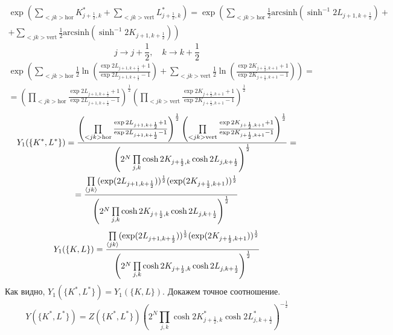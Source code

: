 \documentclass[12pt]{article}
\theoremstyle{definition}
\begin{document}
\begin{enumerate}
\begin{itemize}
\begin{multline}
        \exp\left(\sum\limits_{<jk>\text{hor}}K^*_{j+\frac{1}{2},k}+\sum\limits_{<jk>\text{vert}}L^*_{j+\frac{1}{2},k}\right)=\exp\left(\sum\limits_{<jk>\text{hor}}\frac{1}{2}\text{arcsinh}(\sinh^{-1}2L_{j+1,k+\frac{1}{2}})\right.+\\+\left.\sum\limits_{<jk>\text{vert}}\frac{1}{2}\text{arcsinh}(\sinh^{-1}2K_{j+1,k+\frac{1}{2}})\right)
    \end{multline}
    \begin{equation}
        j\rightarrow j+\frac{1}{2},\quad k\rightarrow k+\frac{1}{2}
    \end{equation}
    \begin{multline}
        \exp\left(\sum\limits_{<jk>\text{hor}}\frac{1}{2}\ln\left(\frac{\exp2L_{j+1,k+\frac{1}{2}}+1}{\exp2L_{j+1,k+\frac{1}{2}}-1}\right)+\sum\limits_{<jk>\text{vert}}\frac{1}{2}\ln\left(\frac{\exp2K_{j+\frac12,k+1}+1}{\exp2K_{j+\frac12,k+1}-1}\right)\right)=\\=\left(\prod\limits_{<jk>\text{hor}}\frac{\exp2L_{j+1,k+\frac{1}{2}}+1}{\exp2L_{j+1,k+\frac{1}{2}}-1}\right)^\frac{1}{2}\left(\prod\limits_{<jk>\text{vert}}\frac{\exp2K_{j+\frac12,k+1}+1}{\exp2K_{j+\frac12,k+1}-1}\right)^\frac{1}{2}
    \end{multline}
    \begin{multline}
        Y_1(\{K^*,L^*\})=\frac{\left(\prod\limits_{<jk>\text{hor}}\frac{\exp2L_{j+1,k+\frac{1}{2}}+1}{\exp2L_{j+1,k+\frac{1}{2}}-1}\right)^\frac{1}{2}\left(\prod\limits_{<jk>\text{vert}}\frac{\exp2K_{j+\frac12,k+1}+1}{\exp2K_{j+\frac12,k+1}-1}\right)^\frac{1}{2}}{\left(2^N\prod\limits_{j,k}\cosh2K_{j+\frac{1}{2},k}\cosh2L_{j,k+\frac{1}{2}}\right)^{\frac{1}{2}}}=\\=\frac{\prod\limits_{\braket{jk}}(\exp(2L_{j+1,k+\frac{1}{2}}))^\frac{1}{2}(\exp(2K_{j+\frac{1}{2},k+1}))^\frac{1}{2}}{\left(2^N\prod\limits_{j,k}\cosh2K_{j+\frac{1}{2},k}\cosh2L_{j,k+\frac{1}{2}}\right)^{\frac{1}{2}}}
    \end{multline}
    \begin{equation}
        Y_1(\{K,L\})=\frac{\prod\limits_{\braket{jk}}(\exp(2L_{j+1,k+\frac{1}{2}}))^\frac{1}{2}(\exp(2K_{j+\frac{1}{2},k+1}))^\frac{1}{2}}{\left(2^N\prod\limits_{j,k}\cosh2K_{j+\frac{1}{2},k}\cosh2L_{j,k+\frac{1}{2}}\right)^{\frac{1}{2}}}
    \end{equation}
    Как видно, $Y_1(\{K^*,L^*\})=Y_1(\{K,L\})$. Докажем точное соотношение.
    \begin{equation}
        Y(\{K^*,L^*\})=Z(\{K^*,L^*\})\left(2^N\prod\limits_{j,k}\cosh2K^*_{j+\frac{1}{2},k}\cosh2L^*_{j,k+\frac{1}{2}}\right)^{-\frac{1}{2}}

\end{equation}
\end{itemize}
\end{enumerate}
\end{document}
